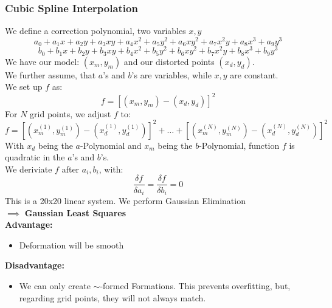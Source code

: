\documentclass{exerciseBlue}
\begin{document}
\subsubsection{Cubic Spline Interpolation}
We define a correction polynomial, two variables $x,y$
$$a_0 + a_1x+a_2y+a_3xy+a_4x^2+a_5y^2+a_6xy^2+a_7x^2y+a_8x^3 + a_9y^3$$
$$b_0 + b_1x+b_2y+b_3xy+b_4x^2+b_5y^2+b_6xy^2+b_7x^2y+b_8x^3 + b_9y^3$$
We have our model: $(x_m,y_m)$ and our distorted points $(x_d,y_d)$.\\
We further assume, that $a$'s and $b$'s are variables, while $x,y$ are constant.\\
We set up $f$ as:
$$f = [(x_m,y_m)-(x_d,y_d)]^2$$
For $N$ grid points, we adjust $f$ to:
$$f = [(x_m^{(1)},y_m^{(1)})-(x_d^{(1)},y_d^{(1)})]^2 + \dots + [(x_m^{(N)},y_m^{(N)})-(x_d^{(N)},y_d^{(N)})]^2$$
With $x_d$ being the $a$-Polynomial and $x_m$ being the $b$-Polynomial, function $f$ is quadratic in the $a$'s and $b$'s.\\
We deriviate $f$ after $a_i,b_i$, with:\\
$$\dfrac{\delta f}{\delta a_i} =\dfrac{\delta f}{\delta b_i} = 0$$
This is a 20x20 linear system. We perform Gaussian Elimination\\ $\implies$ \textbf{Gaussian Least Squares}\\
\textbf{Advantage:} \begin{itemize}
	\item Deformation will be smooth
\end{itemize}
\textbf{Disadvantage:} \begin{itemize}
	\item We can only create $\sim$-formed Formations. This prevents overfitting, but, regarding grid points, they will not always match.
\end{itemize}
\end{document}
